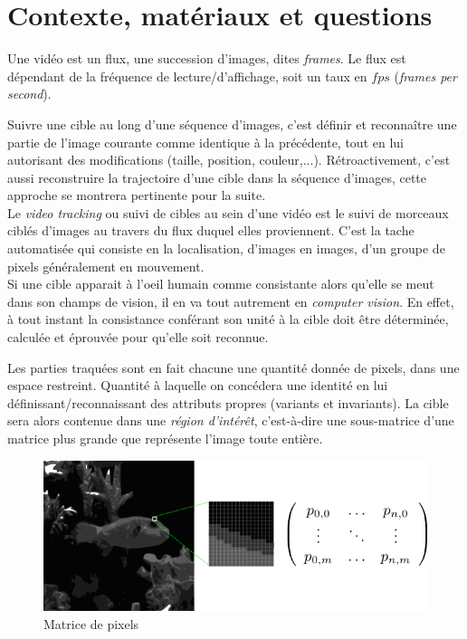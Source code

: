 \documentclass[a4paper,12pt]{report}
\begin{document}
\section{Contexte, matériaux et questions}
Une vidéo est un flux, une succession d'images, dites  \textit{frames}. Le flux est dépendant de la fréquence de lecture/d'affichage, soit un taux en $fps$ (\textit{frames per second}). 

Suivre une cible au long d'une séquence d'images, c'est définir et reconnaître une partie de l'image courante comme identique à la précédente, tout en lui autorisant des modifications (taille, position, couleur,...). Rétroactivement, c'est aussi reconstruire la trajectoire d'une cible dans la séquence d'images, cette approche se montrera pertinente pour la suite.\\

Le \textit{video tracking} ou suivi de cibles au sein d'une vidéo est le suivi de morceaux ciblés d'images au travers du flux duquel elles proviennent. C'est la tache automatisée qui consiste en la localisation, d'images en images, d'un groupe de pixels généralement en mouvement. \\

Si une cible apparait à l'oeil humain comme consistante alors qu'elle se meut dans son champs de vision, il en va tout autrement en \textit{computer vision}. En effet, à tout instant la consistance conférant son unité à la cible doit être déterminée, calculée et éprouvée pour qu'elle soit reconnue. 

Les parties traquées sont en fait chacune une quantité donnée de pixels, dans une espace restreint. Quantité à laquelle on concédera une identité en lui définissant/reconnaissant des attributs propres (variants et invariants). La cible sera alors contenue dans une \textit{région d'intérêt}, c'est-à-dire une sous-matrice d'une matrice plus grande que représente l'image toute entière.\\

\begin{figure}[hbtp]
\centering
\includegraphics[scale=1]{figureImageMatrice.png}
\caption{Matrice de pixels}
\end{figure}
\end{document}
